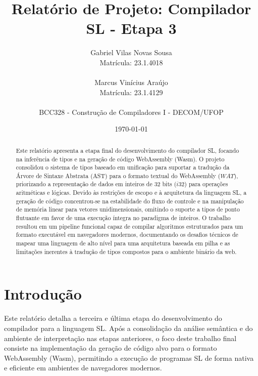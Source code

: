 \documentclass[12pt,a4paper]{article}
\title{Relatório de Projeto: Compilador SL - Etapa 3}
\author{
    Gabriel Vilas Novas Sousa \\
    Matrícula: 23.1.4018 \\
    \\
    Marcus Vinícius Araújo \\
    Matrícula: 23.1.4129 \\
    \\
    BCC328 - Construção de Compiladores I - DECOM/UFOP
}
\date{\today}
\begin{document}
\maketitle

\begin{abstract}
Este relatório apresenta a etapa final do desenvolvimento do compilador SL, focando na inferência de tipos e na geração de código WebAssembly (Wasm). O projeto consolidou o sistema de tipos baseado em unificação para suportar a tradução da Árvore de Sintaxe Abstrata (AST) para o formato textual do WebAssembly ($WAT$), priorizando a representação de dados em inteiros de 32 bits ($i32$) para operações aritméticas e lógicas. Devido às restrições de escopo e à arquitetura da linguagem SL, a geração de código concentrou-se na estabilidade do fluxo de controle e na manipulação de memória linear para vetores unidimensionais, omitindo o suporte a tipos de ponto flutuante em favor de uma execução íntegra no paradigma de inteiros. O trabalho resultou em um pipeline funcional capaz de compilar algoritmos estruturados para um formato executável em navegadores modernos, documentando os desafios técnicos de mapear uma linguagem de alto nível para uma arquitetura baseada em pilha e as limitações inerentes à tradução de tipos compostos para o ambiente binário da web.
\end{abstract}


\newpage
\tableofcontents
\newpage

\section{Introdução}

Este relatório detalha a terceira e última etapa do desenvolvimento do compilador para a linguagem SL. Após a consolidação da análise semântica e do ambiente de interpretação nas etapas anteriores, o foco deste trabalho final consiste na implementação da geração de código alvo para o formato WebAssembly (Wasm), permitindo a execução de programas SL de forma nativa e eficiente em ambientes de navegadores modernos.
\end{document}
